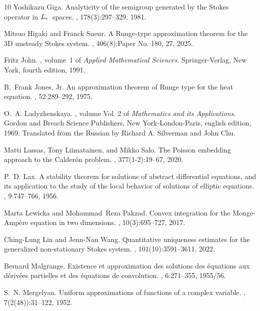 \documentclass[11pt,a4paper]{article}
\numberwithin{equation}{section}
\begin{document}
\begin{thebibliography}{10}
Yoshikazu Giga.
\newblock Analyticity of the semigroup generated by the {S}tokes operator in {$L\sb{r}$}\ spaces.
, 178(3):297--329, 1981.

Mitsuo Higaki and Franck Sueur.
\newblock A {R}unge-type approximation theorem for the 3{D} unsteady {S}tokes system.
, 406(8):Paper No. 180, 27, 2025.

Fritz John.
, volume~1 of {\em Applied Mathematical Sciences}.
\newblock Springer-Verlag, New York, fourth edition, 1991.

B.~Frank Jones, Jr.
\newblock An approximation theorem of {R}unge type for the heat equation.
, 52:289--292, 1975.

O.~A. Ladyzhenskaya.
, volume Vol. 2 of {\em Mathematics and its Applications}.
\newblock Gordon and Breach Science Publishers, New York-London-Paris, english edition, 1969.
\newblock Translated from the Russian by Richard A. Silverman and John Chu.

Matti Lassas, Tony Liimatainen, and Mikko Salo.
\newblock The {P}oisson embedding approach to the {C}alder\'on problem.
, 377(1-2):19--67, 2020.

P.~D. Lax.
\newblock A stability theorem for solutions of abstract differential equations, and its application to the study of the local behavior of solutions of elliptic equations.
, 9:747--766, 1956.

Marta Lewicka and Mohammad~Reza Pakzad.
\newblock Convex integration for the {M}onge-{A}mp\`ere equation in two dimensions.
, 10(3):695--727, 2017.

Ching-Lung Lin and Jenn-Nan Wang.
\newblock Quantitative uniqueness estimates for the generalized non-stationary {S}tokes system.
, 101(10):3591--3611, 2022.

Bernard Malgrange.
\newblock Existence et approximation des solutions des \'equations aux d\'eriv\'ees partielles et des \'equations de convolution.
, 6:271--355, 1955/56.

S.~N. Mergelyan.
\newblock Uniform approximations of functions of a complex variable.
, 7(2(48)):31--122, 1952.


\end{thebibliography}
\end{document}
